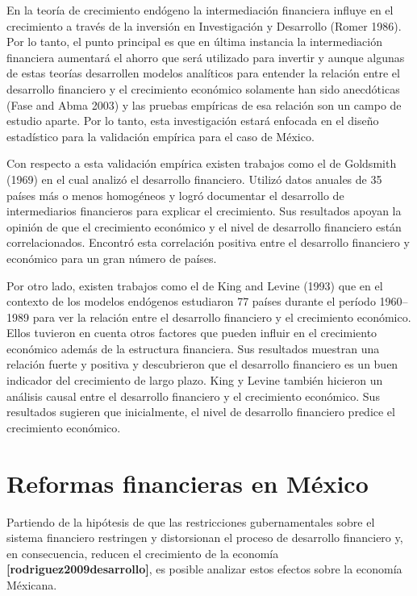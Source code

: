 \documentclass[]{AEA}
\begin{document}
En la teoría de crecimiento endógeno la intermediación financiera
influye en el crecimiento a través de la inversión en Investigación y
Desarrollo (Romer 1986). Por lo tanto, el punto principal es que en
última instancia la intermediación financiera aumentará el ahorro que
será utilizado para invertir y aunque algunas de estas teorías
desarrollen modelos analíticos para entender la relación entre el
desarrollo financiero y el crecimiento económico solamente han sido
anecdóticas (Fase and Abma 2003) y las pruebas empíricas de esa relación
son un campo de estudio aparte. Por lo tanto, esta investigación estará
enfocada en el diseño estadístico para la validación empírica para el
caso de México.

Con respecto a esta validación empírica existen trabajos como el de
Goldsmith (1969) en el cual analizó el desarrollo financiero. Utilizó
datos anuales de 35 países más o menos homogéneos y logró documentar el
desarrollo de intermediarios financieros para explicar el crecimiento.
Sus resultados apoyan la opinión de que el crecimiento económico y el
nivel de desarrollo financiero están correlacionados. Encontró esta
correlación positiva entre el desarrollo financiero y económico para un
gran número de países.

Por otro lado, existen trabajos como el de King and Levine (1993) que en
el contexto de los modelos endógenos estudiaron 77 países durante el
período 1960--1989 para ver la relación entre el desarrollo financiero y
el crecimiento económico. Ellos tuvieron en cuenta otros factores que
pueden influir en el crecimiento económico además de la estructura
financiera. Sus resultados muestran una relación fuerte y positiva y
descubrieron que el desarrollo financiero es un buen indicador del
crecimiento de largo plazo. King y Levine también hicieron un análisis
causal entre el desarrollo financiero y el crecimiento económico. Sus
resultados sugieren que inicialmente, el nivel de desarrollo financiero
predice el crecimiento económico.

\section{Reformas financieras en México}

Partiendo de la hipótesis de que las restricciones gubernamentales sobre
el sistema financiero restringen y distorsionan el proceso de desarrollo
financiero y, en consecuencia, reducen el crecimiento de la economía
\textbf{{[}rodriguez2009desarrollo{]}}, es posible analizar estos
efectos sobre la economía Méxicana.
\end{document}

